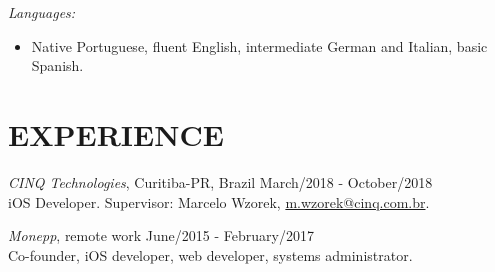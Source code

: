 \documentclass[margin]{res}
\begin{document}
\begin{resume}
			{\sl Languages:}
			\begin{itemize}
				\item[] Native Portuguese, fluent English, intermediate German and Italian, basic Spanish.
			\end{itemize}

 		\section{EXPERIENCE}
 			{\sl CINQ Technologies}, Curitiba-PR, Brazil \hfill March/2018 - October/2018 \\
 			iOS Developer.
			Supervisor: Marcelo Wzorek, \href{mailto:m.wzorek@cinq.com.br}{m.wzorek@cinq.com.br}.

 			{\sl Monepp}, remote work \hfill June/2015 - February/2017 \\
			Co-founder, iOS developer, web developer, systems administrator.
 			 		

\end{resume}
\end{document}

